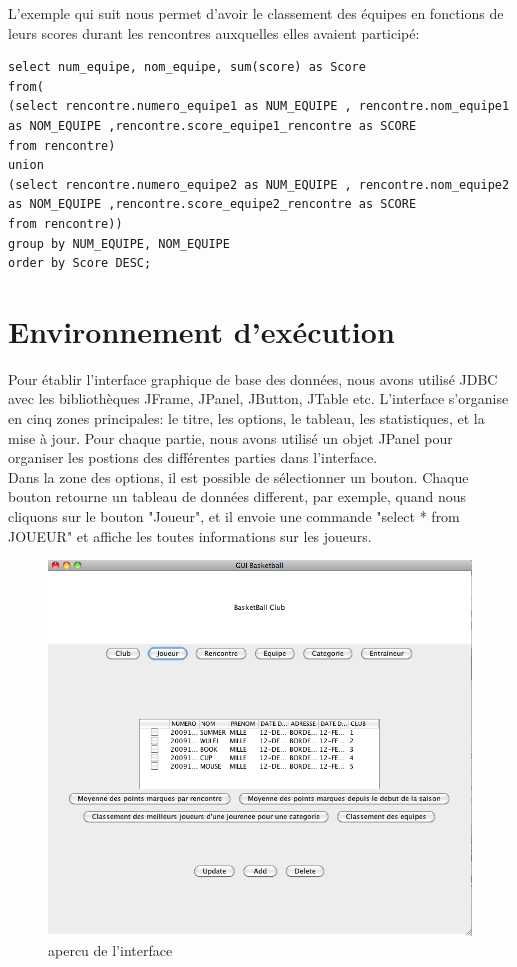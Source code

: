 \documentclass{article}
\begin{document}
L'exemple qui suit nous permet d'avoir le classement des équipes en fonctions de leurs scores durant les rencontres auxquelles elles avaient participé: \\

\begin{verbatim}
select num_equipe, nom_equipe, sum(score) as Score
from(
(select rencontre.numero_equipe1 as NUM_EQUIPE , rencontre.nom_equipe1 as NOM_EQUIPE ,rencontre.score_equipe1_rencontre as SCORE
from rencontre)
union
(select rencontre.numero_equipe2 as NUM_EQUIPE , rencontre.nom_equipe2 as NOM_EQUIPE ,rencontre.score_equipe2_rencontre as SCORE
from rencontre))
group by NUM_EQUIPE, NOM_EQUIPE
order by Score DESC;
\end{verbatim}


\section{Environnement d'exécution}

Pour établir l'interface graphique de base des données, nous avons utilisé JDBC avec les bibliothèques JFrame, JPanel, JButton, JTable etc. L'interface s'organise en cinq zones principales: le titre, les options, le tableau, les statistiques, et la mise à jour. Pour chaque partie, nous avons utilisé un objet JPanel pour organiser les postions des différentes parties dans l'interface. \\

Dans la zone des options, il est possible de sélectionner un bouton. Chaque bouton retourne un tableau de données different, par exemple, quand nous cliquons sur le bouton "Joueur", et il envoie une commande "select * from JOUEUR" et affiche les toutes informations sur les joueurs. \\

\begin{figure}[!h]
\centering
\includegraphics[scale = 0.4] {1.png}
\caption{apercu de l'interface}
\end{figure}
\end{document}
